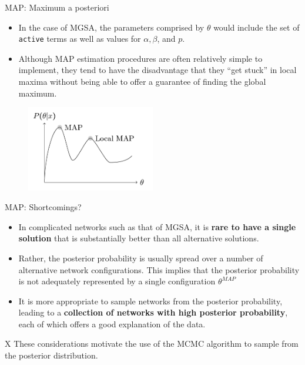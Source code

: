 \documentclass{beamer}
\begin{document}
\begin{frame}{MAP: Maximum a posteriori}
 \begin{itemize}
  \item  In the case of MGSA, the parameters comprised by $\theta$ would
include the set of \texttt{active} terms as well as values for
$\alpha,\beta$, and $p$. 

\item Although MAP estimation procedures are often relatively simple to
implement, they tend to have the disadvantage that they ``get stuck'' in
local maxima  without being
able to offer a guarantee of finding the global maximum.
 \end{itemize}

 \begin{figure}
 \centering
 \includegraphics[width=0.5\textwidth]{./img/MAP.png}
\end{figure}

 
\end{frame}


\begin{frame}{MAP: Shortcomings?}
 
 \begin{itemize}
  \item  In
complicated networks such as that of MGSA, it is \textbf{rare to have a single
solution} that is substantially better than all alternative
solutions. 
\item Rather, the posterior probability is usually spread over a
number of alternative network configurations. This implies that the
posterior probability is not adequately represented by a single
configuration $\theta^{MAP}$
\item It is more appropriate to
sample networks from the posterior probability, leading to a
\textbf{collection of networks with high posterior probability}, each of
which offers a good explanation of the data. 
 \end{itemize}
\begin{mybluebox}{X}
These considerations motivate the
use of the MCMC algorithm to sample from the posterior distribution.
\end{mybluebox}

 
 
\end{frame}
\end{document}
